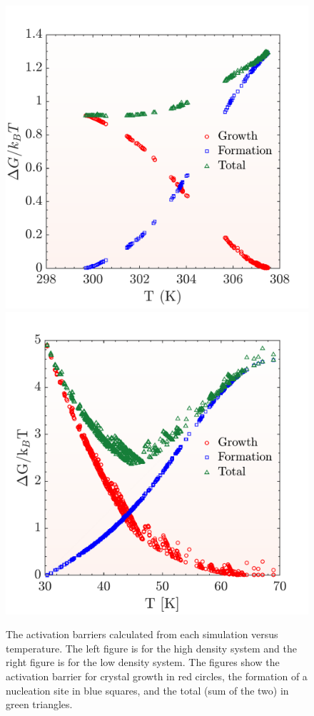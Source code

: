 \begin{figure}[h]
	\centering
	\includegraphics[width = .45\textwidth]{./Figures/Nucleation/high_density/activation_energies.pdf}
	\hspace{.03\textwidth}
	\includegraphics[width = .45\textwidth]{./Figures/Nucleation/low_density/activation_energies.pdf}
	\caption{The activation barriers calculated from each simulation versus temperature.  The left figure is for the high density system and the right figure is for the low density system.  The figures show the activation barrier for crystal growth in red circles, the formation of a nucleation site in blue squares, and the total (sum of the two) in green triangles.  }
	\label{barriers}
\end{figure}

